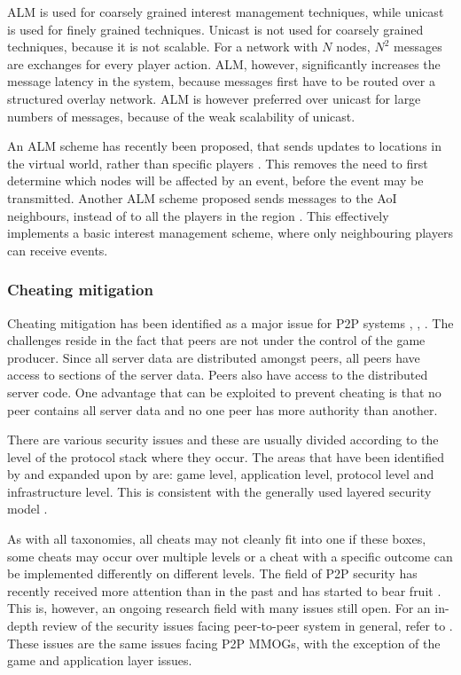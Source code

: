 \documentclass[10pt,a4paper,journal,cspaper,compsoc]{IEEEtran}
\begin{document}
ALM is used for coarsely grained interest management techniques, while unicast is used for finely grained techniques. Unicast is not used for
coarsely grained techniques, because it is not scalable. For a network with $N$ nodes, $N^2$ messages are exchanges for every player action. ALM,
however, significantly increases the message latency in the system, because messages first have to be routed over a structured overlay network. ALM
is however preferred over unicast for large numbers of messages, because of the weak scalability of unicast.

An ALM scheme has recently been proposed, that sends updates to locations in the virtual world, rather than specific players
\cite{Ghaffari_Delaunay_churn_mobility}. This removes the need to first determine which nodes will be affected by an event, before the event may be
transmitted. Another ALM scheme proposed sends messages to the AoI neighbours, instead of to all the players in the region
\cite{Seeger_area_based_gossip_multicast}. This effectively implements a basic interest management scheme, where only neighbouring players can
receive events.

\subsubsection{Cheating mitigation}
\label{key_challenges_cheating}

Cheating mitigation has been identified as a major issue for P2P systems \cite{knutsson_p2p_first}, \cite{challenges_p2p_gaming},
\cite{cheat_proof_event_ordering}. The challenges reside in the fact that peers are not under the control of the game producer. Since all server data
are distributed amongst peers, all peers have access to sections of the server data. Peers also have access to the distributed server code. One
advantage that can be exploited to prevent cheating is that no peer contains all server data and no one peer has more authority than another.

There are various security issues and these are usually divided according to the level of the protocol stack where they occur. The areas that have
been identified by \cite{cheat_proof_event_ordering} and expanded upon by \cite{cheating_taxonomy} are: game level, application level, protocol level
and infrastructure level. This is consistent with the generally used layered security model \cite{distributed_systems_security}.

As with all taxonomies, all cheats may not cleanly fit into one if these boxes, some cheats may occur over multiple levels or a cheat with a specific
outcome can be implemented differently on different levels. The field of P2P security has recently received more attention than in the past and has
started to bear fruit \cite{survey_p2p_game_cheats}. This is, however, an ongoing research field with many issues still open. For an in-depth review
of the security issues facing peer-to-peer system in general, refer to \cite{p2p_security_issues}. These issues are the same issues facing P2P MMOGs,
with the exception of the game and application layer issues.
\end{document}
